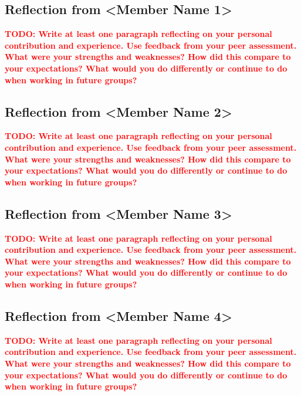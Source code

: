 \documentclass[11pt]{article}
\newcommand{\todo}[1]{\textcolor{red}{\textbf{TODO: #1}}}
\begin{document}
\subsection{Reflection from <Member Name 1>}
\todo{Write at least one paragraph reflecting on your personal contribution and experience. Use feedback from your peer assessment. What were your strengths and weaknesses? How did this compare to your expectations? What would you do differently or continue to do when working in future groups?}

\subsection{Reflection from <Member Name 2>}
\todo{Write at least one paragraph reflecting on your personal contribution and experience. Use feedback from your peer assessment. What were your strengths and weaknesses? How did this compare to your expectations? What would you do differently or continue to do when working in future groups?}

\subsection{Reflection from <Member Name 3>}
\todo{Write at least one paragraph reflecting on your personal contribution and experience. Use feedback from your peer assessment. What were your strengths and weaknesses? How did this compare to your expectations? What would you do differently or continue to do when working in future groups?}

\subsection{Reflection from <Member Name 4>}
\todo{Write at least one paragraph reflecting on your personal contribution and experience. Use feedback from your peer assessment. What were your strengths and weaknesses? How did this compare to your expectations? What would you do differently or continue to do when working in future groups?}
\end{document}
